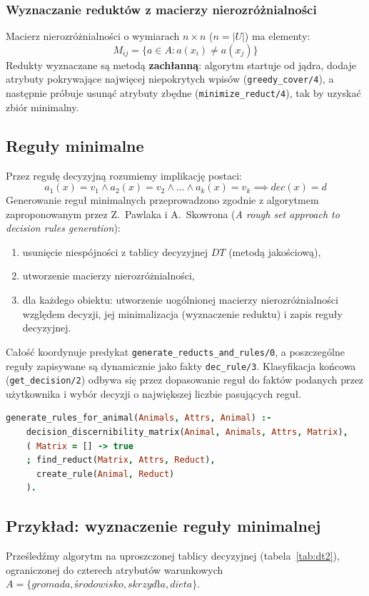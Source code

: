 \documentclass[11pt,a4paper]{article}
\newcommand{\code}[1]{\texttt{#1}}
\begin{document}
\subsubsection{Wyznaczanie reduktów z macierzy nierozróżnialności}
Macierz nierozróżnialności o wymiarach $n\times n$ ($n=|U|$) ma elementy:
\[
M_{ij} = \{a\in A : a(x_i)\ne a(x_j)\}
\]
Redukty wyznaczane są metodą \textbf{zachłanną}: algorytm startuje od jądra,
dodaje atrybuty pokrywające najwięcej niepokrytych wpisów
(\code{greedy\_cover/4}), a następnie próbuje usunąć atrybuty zbędne
(\code{minimize\_reduct/4}), tak by uzyskać zbiór minimalny.

\subsection{Reguły minimalne}
Przez regułę decyzyjną rozumiemy implikację postaci:
\[
a_1(x)=v_1 \wedge a_2(x)=v_2 \wedge \dots \wedge a_k(x)=v_k \implies dec(x)=d
\]
Generowanie reguł minimalnych przeprowadzono zgodnie z algorytmem
zaproponowanym przez Z.~Pawlaka i A.~Skowrona (\textit{A rough set approach to
decision rules generation}):
\begin{enumerate}[noitemsep]
    \item usunięcie niespójności z tablicy decyzyjnej $DT$ (metodą jakościową),
    \item utworzenie macierzy nierozróżnialności,
    \item dla każdego obiektu: utworzenie uogólnionej macierzy nierozróżnialności
          względem decyzji, jej minimalizacja (wyznaczenie reduktu) i zapis
          reguły decyzyjnej.
\end{enumerate}

Całość koordynuje predykat \code{generate\_reducts\_and\_rules/0}, a poszczególne
reguły zapisywane są dynamicznie jako fakty \code{dec\_rule/3}. Klasyfikacja
końcowa (\code{get\_decision/2}) odbywa się przez dopasowanie reguł do faktów
podanych przez użytkownika i wybór decyzji o największej liczbie pasujących reguł.

\begin{lstlisting}[language=Prolog,caption={Generowanie reguły dla obiektu (\code{rough.pl})}]
generate_rules_for_animal(Animals, Attrs, Animal) :-
    decision_discernibility_matrix(Animal, Animals, Attrs, Matrix),
    ( Matrix = [] -> true
    ; find_reduct(Matrix, Attrs, Reduct),
      create_rule(Animal, Reduct)
    ).
\end{lstlisting}

\subsection{Przykład: wyznaczenie reguły minimalnej}
Prześledźmy algorytm na uproszczonej tablicy decyzyjnej (tabela~\ref{tab:dt2}),
ograniczonej do czterech atrybutów warunkowych
$A=\{\textit{gromada}, \textit{środowisko}, \textit{skrzydła}, \textit{dieta}\}$.
\end{document}
